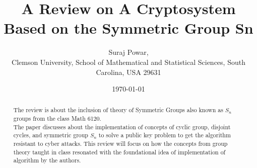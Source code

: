 \documentclass{IEEEtran}
\title{A Review on A Cryptosystem Based on the Symmetric Group Sn}
\author{Suraj Powar, \\
Clemson University, School of Mathematical and Statistical Sciences, South Carolina, USA 29631}
\date{\today}
\begin{document}
\maketitle

\thispagestyle{fancy}
\begin{abstract} The review is about the inclusion of theory of Symmetric Groups also known as $S_n$ groups from the class Math 6120.\\
The paper discusses about the implementation of concepts of cyclic group, disjoint cycles, and symmetric group $S_n$ to solve a public key problem to get the algorithm resistant to cyber attacks. This review will focus on how the concepts from group theory taught in class resonated with the foundational idea of implementation of algorithm by the authors.

\end{abstract}
\end{document}
